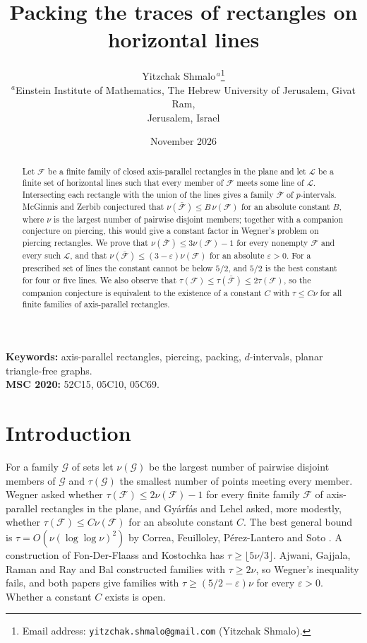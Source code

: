 \documentclass[11pt]{article}
\title{Packing the traces of rectangles on horizontal lines}
\author{Yitzchak Shmalo$^{\,a}$\thanks{Email address:
\texttt{yitzchak.shmalo@gmail.com} (Yitzchak Shmalo).}\\
{\small $^{a}$Einstein Institute of Mathematics, The Hebrew University of
Jerusalem, Givat Ram,}\\
{\small Jerusalem, Israel}}
\date{November 2026}
\theoremstyle{remark}
\newcommand{\F}{\mathcal{F}}
\newcommand{\Fb}{\bar{\mathcal{F}}}
\newcommand{\cL}{\mathcal{L}}
\begin{document}
\maketitle

\begin{abstract}
Let $\F$ be a finite family of closed axis-parallel rectangles in the plane and let $\cL$ be a finite set of horizontal lines such that every member of $\F$ meets some line of $\cL$. Intersecting each rectangle with the union of the lines gives a family $\Fb$ of $p$-intervals. McGinnis and Zerbib conjectured that $\nu(\Fb)\le B\,\nu(\F)$ for an absolute constant $B$, where $\nu$ is the largest number of pairwise disjoint members; together with a companion conjecture on piercing, this would give a constant factor in Wegner's problem on piercing rectangles. We prove that $\nu(\Fb)\le 3\nu(\F)-1$ for every nonempty $\F$ and every such $\cL$, and that $\nu(\Fb)\le(3-\varepsilon)\nu(\F)$ for an absolute $\varepsilon>0$. For a prescribed set of lines the constant cannot be below $5/2$, and $5/2$ is the best constant for four or five lines. We also observe that $\tau(\F)\le\tau(\Fb)\le2\tau(\F)$, so the companion conjecture is equivalent to the existence of a constant $C$ with $\tau\le C\nu$ for all finite families of axis-parallel rectangles.
\end{abstract}

\noindent\textbf{Keywords:} axis-parallel rectangles, piercing, packing, $d$-intervals, planar triangle-free graphs.\\
\textbf{MSC 2020:} 52C15, 05C10, 05C69.

\section{Introduction}\label{sec:intro}

For a family $\mathcal{G}$ of sets let $\nu(\mathcal{G})$ be the largest number of pairwise disjoint members of $\mathcal{G}$ and $\tau(\mathcal{G})$ the smallest number of points meeting every member. Wegner \cite{W} asked whether $\tau(\F)\le 2\nu(\F)-1$ for every finite family $\F$ of axis-parallel rectangles in the plane, and Gy\'arf\'as and Lehel \cite{GL} asked, more modestly, whether $\tau(\F)\le C\nu(\F)$ for an absolute constant $C$. The best general bound is $\tau=O(\nu(\log\log\nu)^2)$ by Correa, Feuilloley, P\'erez-Lantero and Soto \cite{CFPS}. A construction of Fon-Der-Flaass and Kostochka \cite{FK} has $\tau\ge\lfloor5\nu/3\rfloor$. Ajwani, Gajjala, Raman and Ray \cite{AGRR} and Bal \cite{Bal} constructed families with $\tau\ge2\nu$, so Wegner's inequality fails, and both papers give families with $\tau\ge(5/2-\varepsilon)\nu$ for every $\varepsilon>0$. Whether a constant $C$ exists is open.
\end{document}
